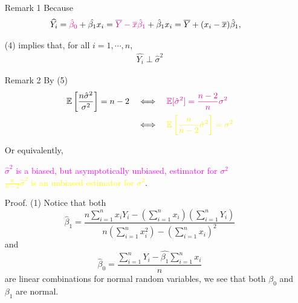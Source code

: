 \begin{frame}[fragile]
\begin{itemize}
	\item[Remark 1]	Because
	\begin{align*}
		\widehat{Y_i} & = \textcolor{magenta}{\hat{\beta}_0}+\hat{\beta_1}x_i
                    = \textcolor{magenta}{\overline{Y}-\overline{x}\hat{\beta}_1} + \hat{\beta}_1x_i
                    = \overline{Y}+(x_i-\overline{x}) \hat{\beta}_1,
\end{align*}
	\item[] (4) implies that, for all $i=1,\cdots,n$,
	\begin{align*}
		\widehat{Y_i}  \perp \hat\sigma^2
	\end{align*}
	\bigskip
	\item[Remark 2] By (5)
	\begin{align*}
		\E\left[\frac{n\hat{\sigma}^2}{\sigma^2}\right] = n-2 & \quad\Longleftrightarrow\quad \textcolor{magenta}{\E[\hat{\sigma}^2] = \frac{n-2}{n}\sigma^2}\\
		                                                      & \quad\Longleftrightarrow\quad \textcolor{yellow}{\E\left[\frac{n}{n-2}\hat{\sigma}^2\right] = \sigma^2}
	\end{align*}
	\item[] Or equivalently,
	\bigskip
\begin{center}
	\textcolor{magenta}{$\hat{\sigma}^2$ is a biased, but asymptotically unbiased, estimator for $\sigma^2$}\\[1em]
	\textcolor{yellow}{$\displaystyle\frac{n}{n-2}\hat{\sigma}^2$ is an unbiased estimator for $\sigma^2$}.
\end{center}
\end{itemize}
\end{frame}
\begin{frame}
\begin{itemize}
	\item[Proof.] (1) Notice that both
		\[
			\hat\beta_1= \frac{n\sum_{i=1}^n x_iY_i - \left(\sum_{i=1}^n x_i\right)\left(\sum_{i=1}^n Y_i\right)}{n\left(\sum_{i=1}^n x_i^2\right)-\left(\sum_{i=1}^n x_i\right)^2}
		\]
		and
		\[
			\hat\beta_0 =  \frac{\sum_{i=1}^nY_i-\hat{\beta_1}\sum_{i=1}^nx_i}{n}
		\]
		are linear combinations for normal random variables, we see that both $\beta_0$ and $\beta_1$ are normal.
		\bigskip
\end{itemize}
\end{frame}
